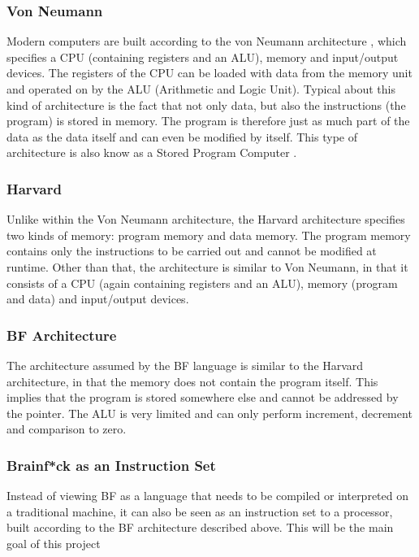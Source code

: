 \subsubsection{Von Neumann}
Modern computers are built according to the von Neumann architecture \cite{vonneumann-wiki}, which specifies a CPU (containing registers and an ALU), memory and input/output devices. The registers of the CPU can be loaded with data from the memory unit and operated on by the ALU (Arithmetic and Logic Unit). Typical about this kind of architecture is the fact that not only data, but also the instructions (the program) is stored in memory. The program is therefore just as much part of the data as the data itself and can even be modified by itself. This type of architecture is also know as a Stored Program Computer \cite{vonneumann-geeks}.

\subsubsection{Harvard}
Unlike within the Von Neumann architecture, the Harvard architecture specifies two kinds of memory: program memory and data memory. The program memory contains only the instructions to be carried out and cannot be modified at runtime. Other than that, the architecture is similar to Von Neumann, in that it consists of a CPU (again containing registers and an ALU), memory (program and data) and input/output devices.

\subsubsection{BF Architecture}
The architecture assumed by the BF language is similar to the Harvard architecture, in that the memory does not contain the program itself. This implies that the program is stored somewhere else and cannot be addressed by the pointer. The ALU is very limited and can only perform increment, decrement and comparison to zero.

\subsubsection{Brainf*ck as an Instruction Set}
Instead of viewing BF as a language that needs to be compiled or interpreted on a traditional machine, it can also be seen as an instruction set to a processor, built according to the BF architecture described above. This will be the main goal of this project

